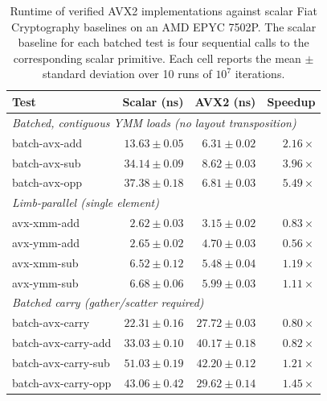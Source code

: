 \begin{table}[h]
\centering
\begin{tabular}{lrrr}
\toprule
\textbf{Test} & \textbf{Scalar (ns)} & \textbf{AVX2 (ns)} & \textbf{Speedup} \\
\midrule
\multicolumn{4}{l}{\emph{Batched, contiguous YMM loads (no layout transposition)}} \\
batch-avx-add               & $13.63 \pm 0.05$           & $\phantom{0}6.31 \pm 0.02$ & $2.16\times$ \\
batch-avx-sub               & $34.14 \pm 0.09$           & $\phantom{0}8.62 \pm 0.03$ & $3.96\times$ \\
batch-avx-opp               & $37.38 \pm 0.18$           & $\phantom{0}6.81 \pm 0.03$ & $5.49\times$ \\
\midrule
\multicolumn{4}{l}{\emph{Limb-parallel (single element)}} \\
avx-xmm-add                 & $\phantom{0}2.62 \pm 0.03$ & $\phantom{0}3.15 \pm 0.02$ & $0.83\times$ \\
avx-ymm-add                 & $\phantom{0}2.65 \pm 0.02$ & $\phantom{0}4.70 \pm 0.03$ & $0.56\times$ \\
avx-xmm-sub                 & $\phantom{0}6.52 \pm 0.12$ & $\phantom{0}5.48 \pm 0.04$ & $1.19\times$ \\
avx-ymm-sub                 & $\phantom{0}6.68 \pm 0.06$ & $\phantom{0}5.99 \pm 0.03$ & $1.11\times$ \\
\midrule
\multicolumn{4}{l}{\emph{Batched carry (gather/scatter required)}} \\
batch-avx-carry             & $22.31 \pm 0.16$           & $27.72 \pm 0.03$           & $0.80\times$ \\
batch-avx-carry-add         & $33.03 \pm 0.10$           & $40.17 \pm 0.18$           & $0.82\times$ \\
batch-avx-carry-sub         & $51.03 \pm 0.19$           & $42.20 \pm 0.12$           & $1.21\times$ \\
batch-avx-carry-opp         & $43.06 \pm 0.42$           & $29.62 \pm 0.14$           & $1.45\times$ \\
\bottomrule
\end{tabular}
\caption{Runtime of verified AVX2 implementations against scalar Fiat Cryptography baselines on an AMD EPYC 7502P. The scalar baseline for each batched test is four sequential calls to the corresponding scalar primitive. Each cell reports the mean $\pm$ standard deviation over 10 runs of $10^7$ iterations.}
\label{tab:perf}
\end{table}

